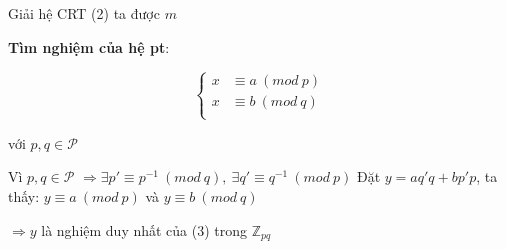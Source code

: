 \documentclass[12pt]{article}
\begin{document}
Giải hệ CRT (2) ta được $m$

\vskip 0.2in
\textbf{Tìm nghiệm của hệ pt}:

\begin{equation}\label{sequations:abs-crt}
\begin{cases}
x &\equiv a\ (mod\ p) \\
x &\equiv b\ (mod\ q) \\
\end{cases}
\end{equation}
\begin{center}
với $p,q\in \mathcal{P}$
\end{center}

Vì $p,q\in \mathcal{P}$ $\Rightarrow \exists p'\equiv p^{-1}\ (mod\ q),\ \exists q'\equiv q^{-1}\ (mod\ p)$
\vskip 0.2in
Đặt $y=aq'q + bp'p$, ta thấy: $y \equiv a\ (mod\ p)$ và  $y \equiv b\ (mod\ q)$

$\Rightarrow y$ là nghiệm duy nhất của (3) trong $\mathbb{Z}_{pq}$
\end{document}
